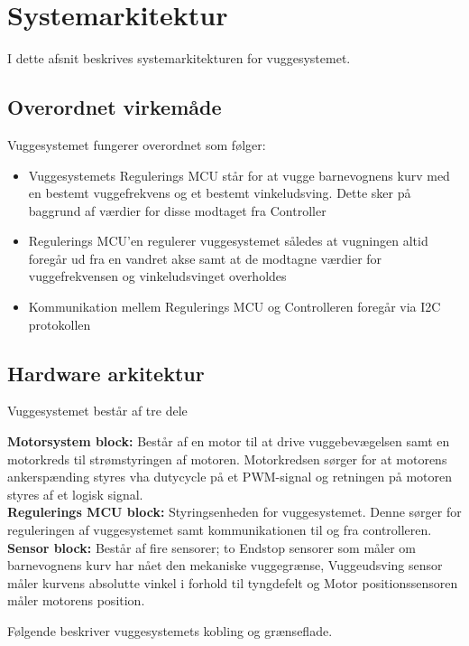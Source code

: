 \section{Systemarkitektur}

I dette afsnit beskrives systemarkitekturen for vuggesystemet.

\subsection*{Overordnet virkemåde}
Vuggesystemet fungerer overordnet som følger:
\begin{itemize}
	\item Vuggesystemets Regulerings MCU står for at vugge barnevognens kurv med en bestemt vuggefrekvens og et bestemt vinkeludsving. Dette sker på baggrund af værdier for disse modtaget fra Controller
	\item Regulerings MCU'en regulerer vuggesystemet således at vugningen altid foregår ud fra en vandret akse samt at de modtagne værdier for vuggefrekvensen og vinkeludsvinget overholdes  
	\item Kommunikation mellem Regulerings MCU og Controlleren foregår via I2C protokollen
\end{itemize}

\subsection{Hardware arkitektur}


Vuggesystemet består af tre dele

\textbf{Motorsystem block:} Består af en motor til at drive vuggebevægelsen samt en motorkreds til strømstyringen af motoren. Motorkredsen sørger for at motorens ankerspænding styres vha dutycycle på et PWM-signal og retningen på motoren styres af et logisk signal.\\
\textbf{Regulerings MCU block:} Styringsenheden for vuggesystemet. Denne sørger for reguleringen af vuggesystemet samt kommunikationen til og fra controlleren.\\
\textbf{Sensor block:} Består af fire sensorer; to Endstop sensorer som måler om barnevognens kurv har nået den mekaniske vuggegrænse, Vuggeudsving sensor måler kurvens absolutte vinkel i forhold til tyngdefelt og Motor positionssensoren måler motorens position.


Følgende beskriver vuggesystemets kobling og grænseflade.

